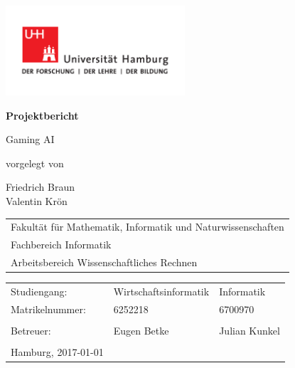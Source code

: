 \documentclass[
	12pt,
	a4paper,
	BCOR10mm,
	DIV14,
	headsepline,
	usegeometry,
]{scrreprt}
\begin{document}

\begin{titlepage}
	\includegraphics[width=0.5\textwidth]{UHH-Logo_2010_Farbe_CMYK}

	\begin{center}
		{\Large \textcolor{uhhred}{\textbf{Projektbericht}}\par}

		\vspace{1cm}

		{\titlefont\huge Gaming AI\par}

		\vspace{1cm}

		{\large vorgelegt von\par}

		\vspace{0.5cm}

		{\large Friedrich Braun\\
				Valentin Krön\par}
	\end{center}

	\vfill

	{\large\noindent\begin{tabular}{l}
		Fakultät für Mathematik, Informatik und Naturwissenschaften\\
		Fachbereich Informatik\\
		Arbeitsbereich Wissenschaftliches Rechnen
	\end{tabular}\par}

	\vspace{1cm}

	{\large\noindent\begin{tabular}{lll}
		Studiengang:    & Wirtschaftsinformatik & Informatik \\
		Matrikelnummer: & 6252218 & 6700970 \\
		\\
		Betreuer:       & Eugen Betke & Julian Kunkel \\
		\\
		Hamburg, 2017-01-01
	\end{tabular}\par}
\end{titlepage}
\end{document}
